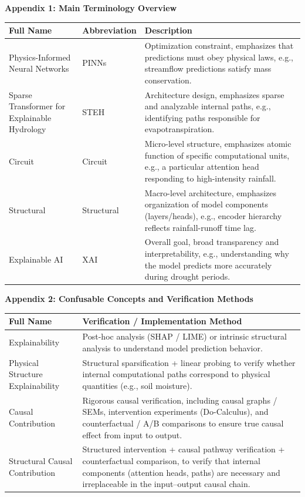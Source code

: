 \begin{table}[htbp]
\centering
\noindent\textbf{Appendix 1: Main Terminology Overview}
\vspace{0.5em}
\begin{tabularx}{\textwidth}{p{3cm} p{2cm} X}
\toprule
\textbf{Full Name} & \textbf{Abbreviation} & \textbf{Description} \\
\midrule
Physics-Informed Neural Networks & PINNs & Optimization constraint, emphasizes that predictions must obey physical laws, e.g., streamflow predictions satisfy mass conservation. \\
Sparse Transformer for Explainable Hydrology & STEH & Architecture design, emphasizes sparse and analyzable internal paths, e.g., identifying paths responsible for evapotranspiration. \\
Circuit & Circuit & Micro-level structure, emphasizes atomic function of specific computational units, e.g., a particular attention head responding to high-intensity rainfall. \\
Structural & Structural & Macro-level architecture, emphasizes organization of model components (layers/heads), e.g., encoder hierarchy reflects rainfall-runoff time lag. \\
Explainable AI & XAI & Overall goal, broad transparency and interpretability, e.g., understanding why the model predicts more accurately during drought periods. \\
\bottomrule
\end{tabularx}
\end{table}

\begin{table}[htbp]
\centering
\noindent\textbf{Appendix 2: Confusable Concepts and Verification Methods}
\vspace{0.5em}
\begin{tabularx}{\textwidth}{p{4cm} X}
\toprule
\textbf{Full Name} & \textbf{Verification / Implementation Method} \\
\midrule
Explainability & Post-hoc analysis (SHAP / LIME) or intrinsic structural analysis to understand model prediction behavior. \\
Physical Structure Explainability & Structural sparsification + linear probing to verify whether internal computational paths correspond to physical quantities (e.g., soil moisture). \\
Causal Contribution & Rigorous causal verification, including causal graphs / SEMs, intervention experiments (Do-Calculus), and counterfactual / A/B comparisons to ensure true causal effect from input to output. \\
Structural Causal Contribution & Structured intervention + causal pathway verification + counterfactual comparison, to verify that internal components (attention heads, paths) are necessary and irreplaceable in the input–output causal chain. \\
\bottomrule
\end{tabularx}
\end{table}
\FloatBarrier